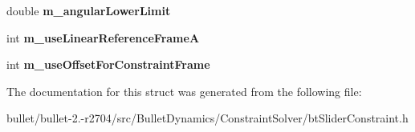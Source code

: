\begin{DoxyCompactItemize}
\item 
\hypertarget{structbt_slider_constraint_double_data_aee1d9b76f0aad82e5eb946163f8a98f8}{double {\bfseries m\+\_\+angular\+Lower\+Limit}}\label{structbt_slider_constraint_double_data_aee1d9b76f0aad82e5eb946163f8a98f8}

\item 
\hypertarget{structbt_slider_constraint_double_data_a17adec4f98a22db22e7dcdbf82b2949d}{int {\bfseries m\+\_\+use\+Linear\+Reference\+Frame\+A}}\label{structbt_slider_constraint_double_data_a17adec4f98a22db22e7dcdbf82b2949d}

\item 
\hypertarget{structbt_slider_constraint_double_data_ac4ed87e4b5b58ba2612c1a988e44e698}{int {\bfseries m\+\_\+use\+Offset\+For\+Constraint\+Frame}}\label{structbt_slider_constraint_double_data_ac4ed87e4b5b58ba2612c1a988e44e698}

\end{DoxyCompactItemize}


The documentation for this struct was generated from the following file\+:\begin{DoxyCompactItemize}
\item 
bullet/bullet-\/2.-\/r2704/src/\+Bullet\+Dynamics/\+Constraint\+Solver/bt\+Slider\+Constraint.\+h\end{DoxyCompactItemize}
